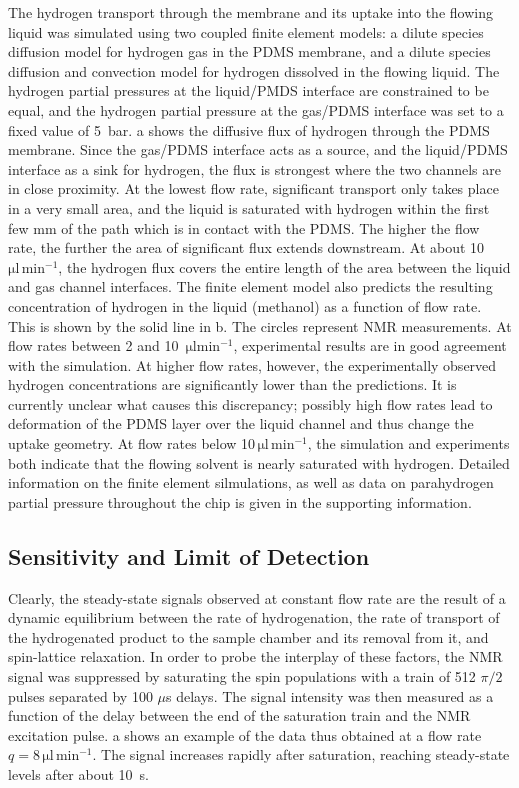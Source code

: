 The hydrogen transport through the membrane and its uptake into the flowing
liquid was simulated using two coupled finite element models: a dilute species
diffusion model for hydrogen gas in the PDMS membrane, and a dilute species
diffusion and convection model for hydrogen dissolved in the flowing liquid. The
hydrogen partial pressures at the liquid/PMDS interface are constrained to be
equal, and the hydrogen partial pressure at the gas/PDMS interface was set to a
fixed value of 5~bar. a shows the diffusive flux of hydrogen
through the PDMS membrane.  Since the gas/PDMS interface acts as a source, and
the liquid/PDMS interface as a sink for hydrogen, the flux is strongest where
the two channels are in close proximity. At the lowest flow rate, significant
transport only takes place in a very small area, and the liquid is saturated
with hydrogen within the first few mm of the path which is in contact with the
PDMS. The higher the flow rate, the further the area of significant flux extends
downstream. At about 10~$\mathrm{\mu l \,min^{-1}}$, the hydrogen flux covers
the entire length of the area between the liquid and gas channel interfaces. The
finite element model also predicts the resulting concentration of hydrogen in
the liquid (methanol) as a function of flow rate. This is shown by the solid
line in  b. The circles represent NMR measurements. At
flow rates between 2 and 10~$\mathrm{\mu l min^{-1}}$, experimental results are
in good agreement with the simulation. At higher flow rates, however, the
experimentally observed hydrogen concentrations are significantly lower than the
predictions. It is currently unclear what causes this discrepancy; possibly high
flow rates lead to deformation of the PDMS layer over the liquid channel and
thus change the uptake geometry. At flow rates below 10$\,\mathrm{\mu l
\,min^{-1}}$, the simulation and experiments both indicate that the flowing
solvent is nearly saturated with hydrogen. Detailed information on the finite
element silmulations, as well as data on parahydrogen partial pressure
throughout the chip is given in the supporting information.

\subsection{Sensitivity and Limit of Detection}


Clearly, the steady-state signals observed at constant flow rate are the result
of a dynamic equilibrium between the rate of hydrogenation, the rate of
transport of the hydrogenated product to the sample chamber and its removal
from it, and spin-lattice relaxation. In order to probe the interplay of these
factors, the NMR signal was suppressed by saturating the spin populations
with a train of 512 $\pi/2$ pulses separated by 100 $\mu$s delays.
The signal intensity was then measured as a function of the delay between the
end of the saturation train and the NMR excitation pulse.
a shows an example of the data thus obtained at a
flow rate $q=8\,\mathrm{\mu l\,\text{min}^{-1}}$.
The signal increases rapidly after saturation, reaching
steady-state levels after about 10~s.

